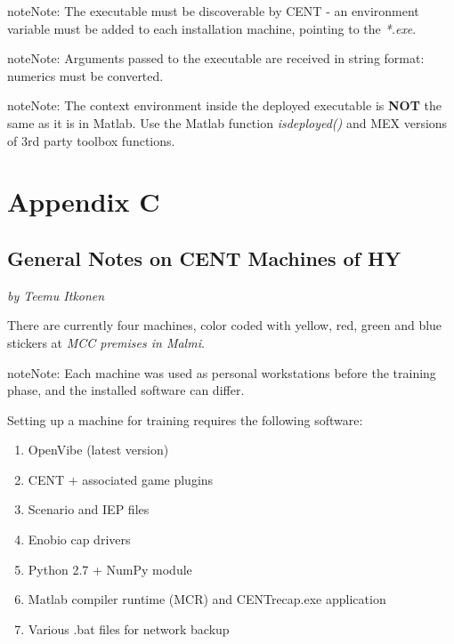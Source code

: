 \documentclass[letterpaper,10pt,english]{sphinxmanual}
\begin{document}
\begin{notice}{note}{Note:}
The executable must be discoverable by CENT - an environment variable must be added to each installation machine, pointing to the \emph{*.exe}.
\end{notice}

\begin{notice}{note}{Note:}
Arguments passed to the executable are received in string format: numerics must be converted.
\end{notice}

\begin{notice}{note}{Note:}
The context environment inside the deployed executable is \textbf{NOT} the same as it is in Matlab. Use the Matlab function \emph{isdeployed()} and MEX versions of 3rd party toolbox functions.
\end{notice}


\chapter{Appendix C}
\label{index:id11}\label{index:appendix-c}

\section{\textbf{General Notes on CENT Machines of HY}}
\label{index:general-notes-on-cent-machines-of-hy}
\emph{by Teemu Itkonen}

There are currently four machines, color coded with yellow, red, green and blue stickers at \emph{MCC premises in Malmi}.

\begin{notice}{note}{Note:}
Each machine was used as personal workstations before the training phase, and the installed software can differ.
\end{notice}

Setting up a machine for training requires the following software:
\begin{enumerate}
\item {} 
OpenVibe (latest version)

\item {} 
CENT + associated game plugins

\item {} 
Scenario and IEP files

\item {} 
Enobio cap drivers

\item {} 
Python 2.7 + NumPy module

\item {} 
Matlab compiler runtime (MCR) and CENTrecap.exe application

\item {} 
Various .bat files for network backup

\end{enumerate}
\end{document}
